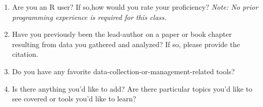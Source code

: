 \documentclass[
]{article}
\begin{document}
\begin{enumerate}
{  OSF, Evernote, Flickr, R, nVivo)}\\
  \newline \newline 
\item
  Are you an R user? If so,how would you rate your proficiency?
  \emph{Note: No prior programming experience is required for this
  class.}\\
  \newline   \newline  
\item
  Have you previously been the lead-author on a paper or book chapter
  resulting from data you gathered and analyzed? If so, please provide
  the citation.\\
  \newline   \newline  
\item
  Do you have any favorite data-collection-or-management-related
  tools?\\
  \newline   \newline  
\item
  Is there anything you'd like to add? Are there particular topics you'd
  like to see covered or tools you'd like to learn?
\end{enumerate}
\end{document}
